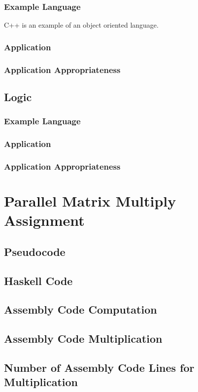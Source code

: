 \documentclass[hidelinks,12pt]{article}
\begin{document}
\subsubsection{Example Language}
C++ is an example of an object oriented language.
\subsubsection{Application}
\subsubsection{Application Appropriateness}
\subsection{Logic}
\subsubsection{Example Language}
\subsubsection{Application}
\subsubsection{Application Appropriateness}

\section{Parallel Matrix Multiply Assignment}
\subsection{Pseudocode}
\subsection{Haskell Code}
\subsection{Assembly Code Computation}
\subsection{Assembly Code Multiplication}
\subsection{Number of Assembly Code Lines for Multiplication}
\end{document}
